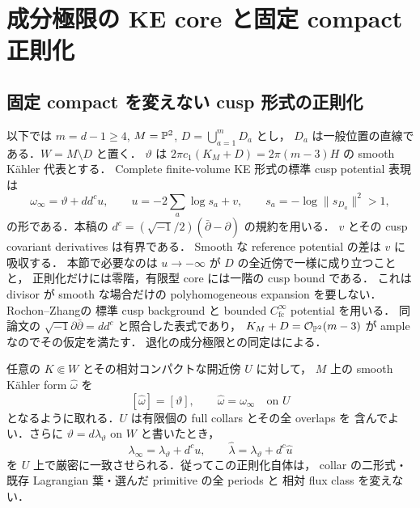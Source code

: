 \section{成分極限の KE core と固定 compact 正則化}
\label{ke:component-core-geometry-section}

\subsection{固定 compact を変えない cusp 形式の正則化}

以下では $m=d-1\ge4$, $M=\mathbb P^2$, $D=\bigcup_{a=1}^mD_a$ とし，
$D_a$ は一般位置の直線である．$W=M\setminus D$ と置く．
$\vartheta$ は $2\pi c_1(K_M+D)=2\pi(m-3)H$ の smooth K\"ahler 代表とする．
Complete finite-volume KE 形式の標準 cusp potential 表現は
\begin{equation}\label{ke:eq:core-cusp-potential}
 \omega_\infty=\vartheta+dd^c u,\qquad
 u=-2\sum_a\log s_a+v,\qquad
 s_a=-\log\|s_{D_a}\|^2>1,
\end{equation}
の形である．本稿の $d^c=(\sqrt{-1}/2)(\bar\partial-\partial)$ の規約を用いる．
$v$ とその cusp covariant derivatives は有界である．
Smooth な reference potential の差は $v$ に吸収する．
本節で必要なのは $u\to-\infty$ が $D$ の全近傍で一様に成り立つことと，
正則化だけには零階，有限型 core には一階の cusp bound である．
これは divisor が smooth な場合だけの polyhomogeneous expansion を要しない．
Rochon--Zhang\cite[\S5, (5.3)--(5.6), Theorem~5.1]{RochonZhang}の
標準 cusp background と bounded $C^\infty_{\mathrm{fc}}$ potential を用いる．
同論文の $\sqrt{-1}\partial\bar\partial=dd^c$ と照合した表式であり，
$K_M+D=\mathcal O_{\mathbb P^2}(m-3)$ が ample なのでその仮定を満たす．
退化の成分極限との同定は\cite[\texttt{pair:thm:fixed-end-moment}の証明]{KELocalCurrent}による．

\begin{proposition}
\label{ke:fixed-compact-cusp-regularization}
任意の $K\Subset W$ とその相対コンパクトな開近傍 $U$ に対して，
$M$ 上の smooth K\"ahler form $\widehat\omega$ を
\[
 [\widehat\omega]=[\vartheta],\qquad
 \widehat\omega=\omega_\infty\quad\text{on }U
\]
となるように取れる．$U$ は有限個の full collars とその全 overlaps を
含んでよい．さらに $\vartheta=d\lambda_\vartheta$ on $W$ と書いたとき，
\[
 \lambda_\infty=\lambda_\vartheta+d^cu,\qquad
 \widehat\lambda=\lambda_\vartheta+d^c\widehat u
\]
を $U$ 上で厳密に一致させられる．従ってこの正則化自体は，
collar の二形式・既存 Lagrangian 葉・選んだ primitive の全 periods と
相対 flux class を変えない．
\end{proposition}

